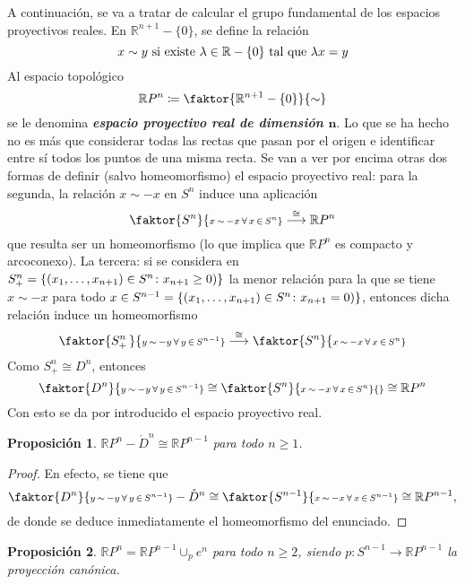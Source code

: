 \documentclass[11pt]{report}
\newtheorem{proposition}{Proposición}[chapter]
\theoremstyle{definition}
\theoremstyle{definition}
\theoremstyle{remark}
\newcommand{\R}{\mathbb R}
\begin{document}
A continuación, se va a tratar de calcular el grupo fundamental de los espacios proyectivos reales. En $\R^{n+1} - \{0\}$, se define la relación 
\[x \sim y \textup{ si existe } \lambda \in \R - \{0\} \textup{ tal que } \lambda x = y\]
Al espacio topológico
\[\R P^n \coloneqq \faktor{\R^{n+1} - \{0\}}{\sim}\]
se le denomina \textbf{\textit{espacio proyectivo real de dimensión $\bm{n}$}}. Lo que se ha hecho no es más que considerar todas las rectas que pasan por el origen e identificar entre sí todos los puntos de  una misma recta. Se van a ver por encima otras dos formas de definir (salvo homeomorfismo) el espacio proyectivo real: para la segunda, la relación $x \sim -x$ en $S^{n}$ induce una aplicación 
\[\faktor{S^n}{\scriptstyle{x \, \sim \, -x \, \forall \, x \, \in \, S^n}} \overset{\cong}{\longrightarrow} \R P^n\] que resulta ser un homeomorfismo (lo que implica que $\R P^n$ es compacto y arcoconexo). La tercera: si se considera en $S^n_+  =\{(x_1,\mathellipsis,x_{n+1}) \in S^n \colon x_{n+1} \geq 0)\}$ la menor relación para la que se tiene $x \sim -x$ para todo $x \in S^{n-1} = \{(x_1,\mathellipsis,x_{n+1}) \in S^n \colon x_{n+1} = 0)\}$, entonces dicha relación induce un homeomorfismo
\[\faktor{S^n_+ \,}{\scriptstyle{y \, \sim \, -y \, \forall \, y \, \in \, S^{n-1}}} \overset{\cong}{\longrightarrow} \faktor{S^n}{\scriptstyle{x \, \sim \, -x \, \forall \, x \, \in \, S^n}}\]
Como $S^n_+ \cong D^n$, entonces
\[\faktor{D^n}{\scriptstyle{y \, \sim \, -y \, \forall \, y \, \in \, S^{n-1}}}\cong \faktor{S^n}{\scriptstyle{x \, \sim \, -x \, \forall \, x \, \in \, S^n}} {} \cong \R P^n\]
Con esto se da por introducido el espacio proyectivo real.

\begin{proposition}
$\R P^n - \mathring{D}^n \cong \R P^{n-1}$ para todo $n \geq 1$.
\end{proposition}
\begin{proof}
En efecto, se tiene que
\[\faktor{D^n}{\scriptstyle{y \, \sim \, -y \, \forall \, y \, \in \, S^{n-1}}} - \mathring{D}^n \cong \faktor{S^{n-1}}{\scriptstyle{x \, \sim \, -x \, \forall \, x \, \in \, S^{n-1}}} \cong \R P^{n-1},\]
de donde se deduce inmediatamente el homeomorfismo del enunciado.
\end{proof}

\begin{proposition}
$\R P^n = \R P^{n-1} \cup_p e^n$ para todo $n \geq 2$, siendo $p \colon S^{n-1} \longrightarrow \R P^{n-1}$ la proyección canónica.
\end{proposition}
\end{document}
